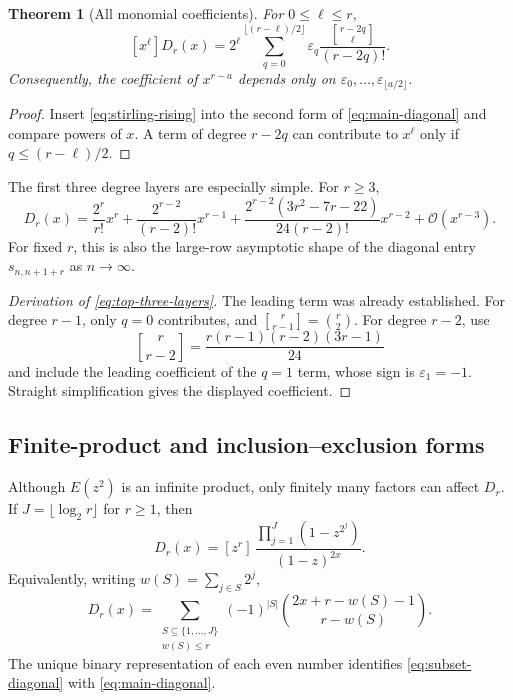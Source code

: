 \documentclass[11pt,oneside]{article}
\numberwithin{equation}{section}
\newtheorem{theorem}{Theorem}[section]
\theoremstyle{definition}
\theoremstyle{remark}
\newcommand{\eps}{\varepsilon}
\newcommand{\coeff}[2]{[z^{#1}]\,#2}
\newcommand{\bigO}{\mathcal O}
\newcommand{\Diag}{D}
\newcommand{\stirlingfirst}[2]{\genfrac{[}{]}{0pt}{}{#1}{#2}}
\begin{document}
\begin{theorem}[All monomial coefficients]
For \(0\le\ell\le r\),
\begin{equation}
 \boxed{
 [x^\ell]\Diag_r(x)=
 2^\ell
 \sum_{q=0}^{\lfloor(r-\ell)/2\rfloor}
 \eps_q\frac{\stirlingfirst{r-2q}{\ell}}{(r-2q)!}.}
 \label{eq:all-monomial-coefficients}
\end{equation}
Consequently, the coefficient of \(x^{r-a}\) depends only on
\(\eps_0,\ldots,\eps_{\lfloor a/2\rfloor}\).
\end{theorem}

\begin{proof}
Insert \eqref{eq:stirling-rising} into the second form of
\eqref{eq:main-diagonal} and compare powers of \(x\).  A term of degree
\(r-2q\) can contribute to \(x^\ell\) only if \(q\le(r-\ell)/2\).
\end{proof}

The first three degree layers are especially simple.  For \(r\ge3\),
\begin{equation}
 \boxed{
 \Diag_r(x)=
 \frac{2^r}{r!}x^r
 +\frac{2^{r-2}}{(r-2)!}x^{r-1}
 +\frac{2^{r-2}(3r^2-7r-22)}{24(r-2)!}x^{r-2}
 +\bigO(x^{r-3}).}
 \label{eq:top-three-layers}
\end{equation}
For fixed \(r\), this is also the large-row asymptotic shape of the diagonal
entry \(s_{n,n+1+r}\) as \(n\to\infty\).

\begin{proof}[Derivation of \eqref{eq:top-three-layers}]
The leading term was already established.  For degree \(r-1\), only \(q=0\)
contributes, and
\(
\stirlingfirst{r}{r-1}=\binom r2
\).
For degree \(r-2\), use
\[
 \stirlingfirst{r}{r-2}
 =\frac{r(r-1)(r-2)(3r-1)}{24}
\]
and include the leading coefficient of the \(q=1\) term, whose sign is
\(\eps_1=-1\).  Straight simplification gives the displayed coefficient.
\end{proof}

\subsection{Finite-product and inclusion--exclusion forms}

Although \(E(z^2)\) is an infinite product, only finitely many factors can
affect \(\Diag_r\).  If \(J=\lfloor\log_2r\rfloor\) for \(r\ge1\), then
\begin{equation}
 \Diag_r(x)=
 \coeff{r}{
 \frac{\prod_{j=1}^{J}(1-z^{2^j})}{(1-z)^{2x}}}.
 \label{eq:finite-product-diagonal}
\end{equation}
Equivalently, writing \(w(S)=\sum_{j\in S}2^j\),
\begin{equation}
 \Diag_r(x)=
 \sum_{\substack{S\subseteq\{1,\ldots,J\}\\w(S)\le r}}
 (-1)^{|S|}
 \binom{2x+r-w(S)-1}{r-w(S)}.
 \label{eq:subset-diagonal}
\end{equation}
The unique binary representation of each even number identifies
\eqref{eq:subset-diagonal} with \eqref{eq:main-diagonal}.
\end{document}
